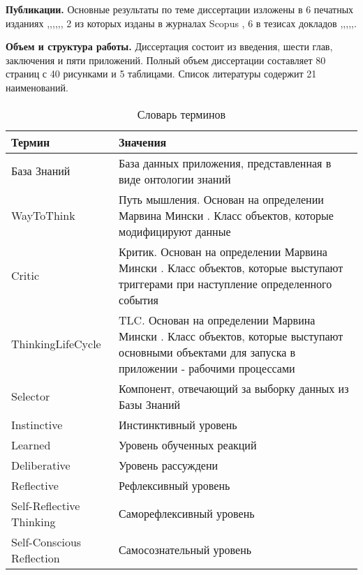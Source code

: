 \textbf{Публикации.} Основные результаты по теме диссертации изложены в 6 печатных изданиях  \cite{Lobachevskii},\cite{WCIT-2012},\cite{RCDL-2014},\cite{AINL-2013},\cite{ISGZ},\cite{AMSTA-2015}, 
2 из которых изданы в журналах Scopus 
\cite{RCDL-2014}, \cite{AMSTA-2015} 
6 в тезисах докладов \cite{Lobachevskii},\cite{WCIT-2012},\cite{RCDL-2014},\cite{AINL-2013},\cite{ISGZ},\cite{AMSTA-2015}.

\textbf{Объем и структура работы.} Диссертация состоит из введения, шести глав, заключения и пяти приложений. Полный объем диссертации составляет 80 страниц с 40 рисунками и 5 таблицами. Список литературы содержит 21 наименований.
\clearpage
\begin{table} [htbp]
   \centering
   \parbox{15cm}{\caption{Словарь терминов}\label{Glossary}}
  \begin{tabular}{| p{5cm} ||p{10cm} |}
  \hline
  \hline
Термин & Значения \\
  \hline
  \hline
База Знаний	& База данных приложения, представленная в виде онтологии знаний \\
 \hline
WayToThink	& Путь мышления. Основан на определении Марвина Мински \cite{EmotionMachine}. Класс объектов, которые модифицируют данные \\
 \hline
Critic	& Критик. Основан на определении Марвина Мински \cite{EmotionMachine}. Класс объектов, которые выступают триггерами при наступление определенного события \\
 \hline
ThinkingLifeCycle	& TLC. Основан на определении Марвина Мински \cite{EmotionMachine}. Класс объектов, которые выступают основными объектами для запуска в приложении - рабочими процессами \\
 \hline
Selector	& Компонент, отвечающий за выборку данных из Базы Знаний \\
\hline
Instinctive	& Инстинктивный уровень \\
\hline
Learned	& Уровень обученных реакций \\
\hline
Deliberative	& Уровень рассуждени \\
\hline
Reflective	& Рефлексивный уровень \\
\hline
Self-Reflective Thinking	 & Саморефлексивный уровень \\
\hline
Self-Conscious Reflection	& Самосознательный уровень \\
\hline
  \hline
\end{tabular}
\end{table}


\clearpage
